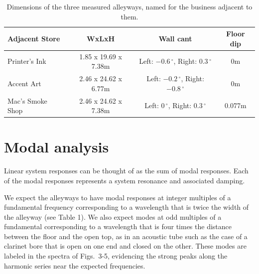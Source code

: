 \documentclass{aes137}
\renewcommand{\deg}{\,^{\circ}}
\begin{document}
\begin{table}
\begin{center} 
\begin{tabular}{|l|c|c|c|}
\hline
\textbf{Adjacent Store} & \textbf{WxLxH} & \textbf{Wall cant} & \textbf{Floor dip} \\
\hline
Printer's Ink & 1.85 x 19.69 x 7.38m & Left: $-0.6\deg$, Right: $0.3\deg$ & 0m \\
\hline
Accent Art & 2.46 x 24.62 x 6.77m & Left: $-0.2\deg$, Right: $-0.8\deg$ & 0m \\
\hline
Mac's Smoke Shop & 2.46 x 24.62 x 7.38m & Left: $0\deg$, Right: $0.3\deg$ & 0.077m \\
\hline
\end{tabular} \caption{Dimensions of the three measured alleyways, named for the business adjacent to them.}
\end{center}
\label{table:geometries}
\end{table}

	



\section{Modal analysis}

Linear system responses can be thought of as the sum of modal
responses. Each of the modal responses represents a system resonance and
associated damping. 

We expect the alleyways to have modal responses at
integer multiples of a fundamental frequency corresponding to a
wavelength that is twice the width of the alleyway (see Table 1). %
We also expect modes at odd multiples of a fundamental corresponding to a wavelength
that is four times the distance between the floor and the open
top, as in an acoustic tube such as the case of a clarinet bore that is
open on one end and closed on the other. These modes are labeled in
the spectra of Figs.~3-5, evidencing the strong peaks along the harmonic series near the expected frequencies.

\end{document}
